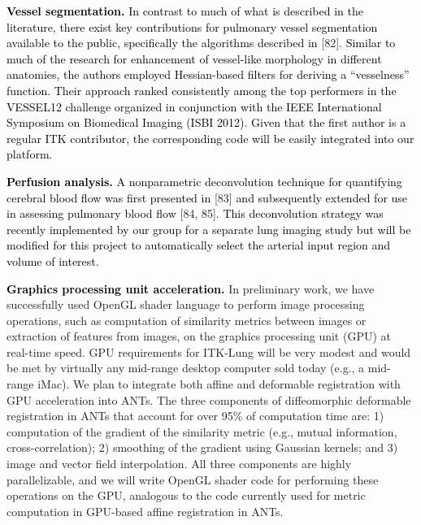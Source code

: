\documentclass[11pt,]{article}
\begin{document}
\textbf{\textcolor{black}{Vessel segmentation.}}
\textcolor{black}{In contrast to much of what is described in the literature, there exist
key contributions for pulmonary vessel segmentation available to the public, specifically
the algorithms described in} {[}82{]}.
\textcolor{black}{Similar to much of the
research for enhancement of vessel-like morphology in different anatomies, the authors
employed Hessian-based filters for deriving a ``vesselness'' function.
Their approach ranked consistently among the top performers in the
VESSEL12 challenge organized in conjunction with the IEEE International Symposium on
Biomedical Imaging (ISBI 2012).  Given that the first author is a regular
ITK contributor, the corresponding code will be easily integrated into our platform.
}

\textbf{\textcolor{black}{Perfusion analysis.}}
\textcolor{black}{A nonparametric deconvolution technique for quantifying cerebral blood
flow was first presented in} {[}83{]}
\textcolor{black}{and subsequently extended for use in assessing
pulmonary blood flow} {[}84,
85{]}\textcolor{black}{.  This deconvolution strategy was recently
implemented by our group for a separate lung imaging study but will be modified for this
project to automatically select the arterial input region and volume of interest.}

\textbf{\textcolor{black}{Graphics processing unit acceleration.}} In
preliminary work, we have successfully used OpenGL shader language to
perform image processing operations, such as computation of similarity
metrics between images or extraction of features from images, on the
graphics processing unit (GPU) at real-time speed. GPU requirements for
ITK-Lung will be very modest and would be met by virtually any mid-range
desktop computer sold today (e.g., a mid-range iMac). We plan to
integrate both affine and deformable registration with GPU acceleration
into ANTs. The three components of diffeomorphic deformable registration
in ANTs that account for over 95\% of computation time are: 1)
computation of the gradient of the similarity metric (e.g., mutual
information, cross-correlation); 2) smoothing of the gradient using
Gaussian kernels; and 3) image and vector field interpolation. All three
components are highly parallelizable, and we will write OpenGL shader
code for performing these operations on the GPU, analogous to the code
currently used for metric computation in GPU-based affine registration
in ANTs.
\end{document}

